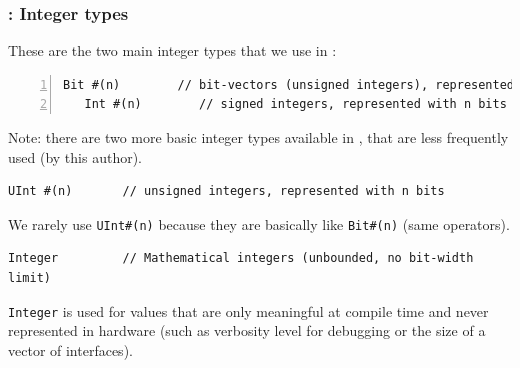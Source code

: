 
\begin{frame}[fragile]
\frametitle{{\BSV}: Integer types}

\footnotesize

These are the two main integer types that we use in {\BSV}:

\begin{Verbatim}[frame=single, numbers=left]
   Bit #(n)        // bit-vectors (unsigned integers), represented with n bits
   Int #(n)        // signed integers, represented with n bits
\end{Verbatim}

\PAUSE{\vspace{10ex}}

Note: there are two more basic integer types available in {\BSV}, that
are less frequently used (by this author).

\vspace{2ex}

\begin{Verbatim}[frame=single]
   UInt #(n)       // unsigned integers, represented with n bits
\end{Verbatim}

We rarely use \verb|UInt#(n)| because they are basically like
\verb|Bit#(n)| (same operators).

\vspace{5ex}

\begin{Verbatim}[frame=single]
   Integer         // Mathematical integers (unbounded, no bit-width limit)
\end{Verbatim}

\verb|Integer| is used for values that are only meaningful at compile
time and never represented in hardware (such as verbosity level for
debugging or the size of a vector of interfaces).

\end{frame}


